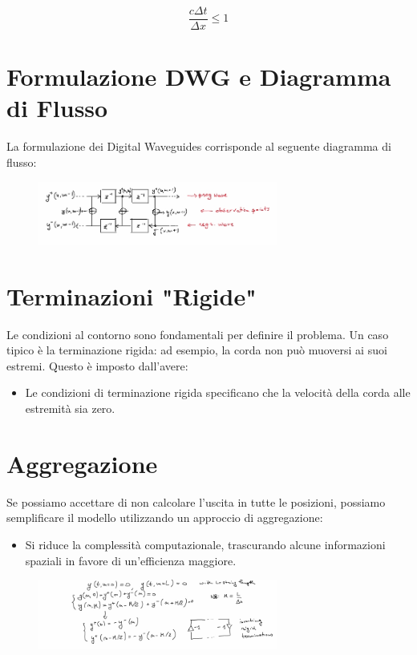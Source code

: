 \[
\frac{c \Delta t}{\Delta x} \leq 1
\]

\section{Formulazione DWG e Diagramma di Flusso}

La formulazione dei Digital Waveguides corrisponde al seguente diagramma di flusso:
\begin{figure}[H]
    \centering
    \includegraphics[width=0.7\textwidth]{capitoli/capitolo14/immagini/image2.jpeg}
\end{figure}

\section{Terminazioni "Rigide"}

Le condizioni al contorno sono fondamentali per definire il problema. Un caso tipico è la terminazione rigida: ad esempio, la corda non può muoversi ai suoi estremi. Questo è imposto dall'avere:

\begin{itemize}
  \item Le condizioni di terminazione rigida specificano che la velocità della corda alle estremità sia zero.
\end{itemize}

\section{Aggregazione}

Se possiamo accettare di non calcolare l'uscita in tutte le posizioni, possiamo semplificare il modello utilizzando un approccio di aggregazione:

\begin{itemize}
  \item Si riduce la complessità computazionale, trascurando alcune informazioni spaziali in favore di un'efficienza maggiore.
\end{itemize}

\begin{figure}[H]
    \centering
    \includegraphics[width=0.7\textwidth]{capitoli/capitolo14/immagini/image3.jpeg}
\end{figure}

